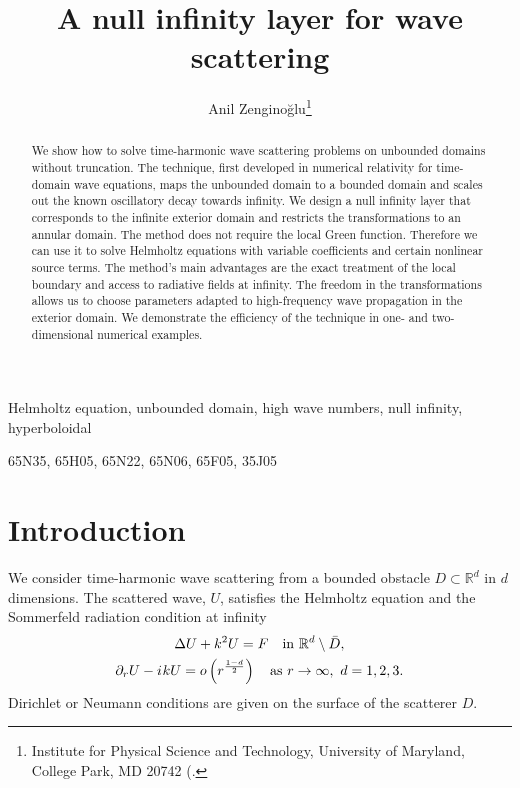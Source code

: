 \documentclass[final,onefignum,onetabnum]{siamart190516}
\title{A null infinity layer for wave scattering}
\author{Anil Zengino\u{g}lu\thanks{Institute for Physical Science and Technology, University of Maryland, College Park, MD 20742
  (\email{anil@umd.edu)}.}}
\date{}
\newcommand{\iu}{{i\mkern1mu}}
\begin{document}
\maketitle

\begin{abstract}
We show how to solve time-harmonic wave scattering problems on unbounded domains without truncation. The technique, first developed in numerical relativity for time-domain wave equations, maps the unbounded domain to a bounded domain and scales out the known oscillatory decay towards infinity. We design a null infinity layer that corresponds to the infinite exterior domain and restricts the transformations to an annular domain. The method does not require the local Green function. Therefore we can use it to solve Helmholtz equations with variable coefficients and certain nonlinear source terms. The method's main advantages are the exact treatment of the local boundary and access to radiative fields at infinity. The freedom in the transformations allows us to choose parameters adapted to high-frequency wave propagation in the exterior domain. We demonstrate the efficiency of the technique in one- and two-dimensional numerical examples.
\end{abstract}

\begin{keywords}
	Helmholtz equation, unbounded domain, high wave numbers, null infinity, hyperboloidal
\end{keywords}

\begin{AMS}
	65N35, %
	65H05, %
	65N22, %
	65N06, %
	65F05, %
	35J05  %
\end{AMS}


\section{Introduction}

We consider time-harmonic wave scattering from a bounded obstacle $D \subset \mathbb{R}^d$ in $d$ dimensions. The scattered wave, $U$, satisfies the Helmholtz equation and the Sommerfeld radiation condition at infinity
\begin{equation}
	\label{eq:helm}
	\begin{gathered}
		\Delta U + k^2 U = F \quad \mathrm{in } \ \mathbb{R}^d\setminus \bar{D}, \\
		\partial_r U - \iu k U = o\left(r^{\frac{1-d}{2}}\right) \quad \mathrm{as} \ r\to\infty,\ d=1,2,3.
	\end{gathered}
\end{equation}
Dirichlet or Neumann conditions are given on the surface of the scatterer $D$.
\end{document}
